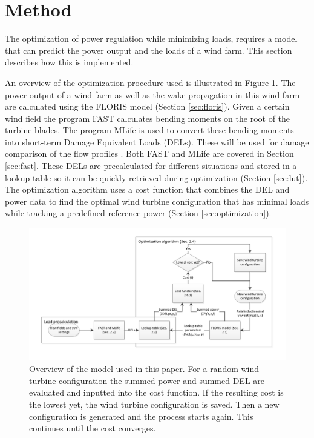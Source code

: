 \section{Method} \label{sec:method}
The optimization of power regulation while minimizing loads, requires a model that can predict the power output and the loads of a wind farm. This section describes how this is implemented.

An overview of the optimization procedure used is illustrated in Figure \ref{fig:optim}.
The power output of a wind farm as well as the wake propagation in this wind farm are calculated using the FLORIS model \cite{Gebraad2016} (Section \ref{sec:floris}). Given a certain wind field the program FAST calculates bending moments on the root of the turbine blades. The program MLife is used to convert these bending moments into short-term Damage Equivalent Loads (DELs). These will be used for damage comparison of the flow profiles \cite{MLife}. Both FAST and MLife are covered in Section \ref{sec:fast}. These DELs are precalculated for different situations and stored in a lookup table so it can be quickly retrieved during optimization (Section \ref{sec:lut}). The optimization algorithm uses a cost function that combines the DEL and power data to find the optimal wind turbine configuration that has minimal loads while tracking a predefined reference power (Section \ref{sec:optimization}).

\begin{figure}
	\includegraphics[width=\linewidth]{./Figures/OptimizationProcess.pdf}
	\caption{Overview of the model used in this paper. For a random wind turbine configuration the summed power and summed DEL are evaluated and inputted into the cost function. If the resulting cost is the lowest yet, the wind turbine configuration is saved. Then a new configuration is generated and the process starts again. This continues until the cost converges.}
	\label{fig:optim}
\end{figure}


